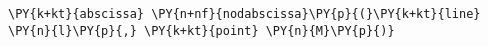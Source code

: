 \begin{Verbatim}[commandchars=\\\{\}]
      \PY{k+kt}{abscissa} \PY{n+nf}{nodabscissa}\PY{p}{(}\PY{k+kt}{line} \PY{n}{l}\PY{p}{,} \PY{k+kt}{point} \PY{n}{M}\PY{p}{)}
\end{Verbatim}
